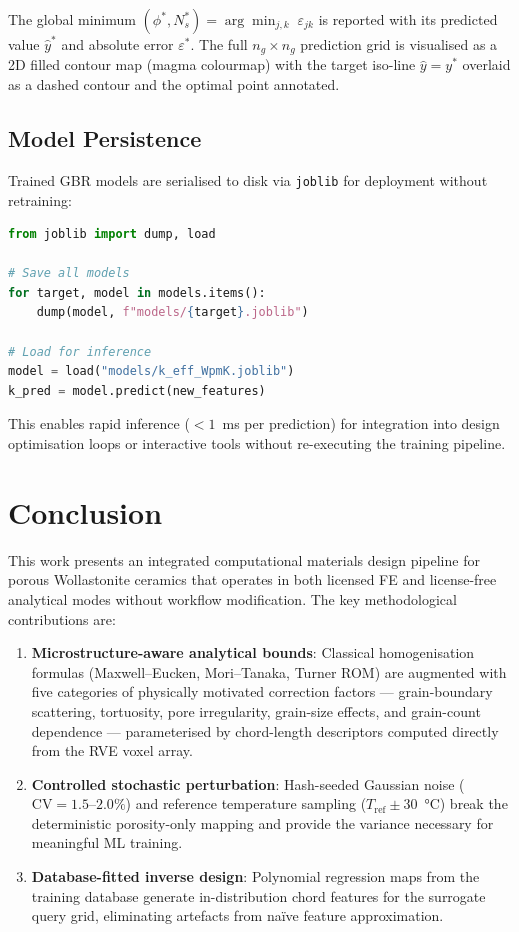 \documentclass[11pt,a4paper]{article}
\begin{document}
The global minimum $(\phi^*, N_s^*) = \arg\min_{j,k}\; \varepsilon_{jk}$ is reported with its predicted value $\hat{y}^*$ and absolute error $\varepsilon^*$. The full $n_g \times n_g$ prediction grid is visualised as a 2D filled contour map (magma colourmap) with the target iso-line $\hat{y} = y^*$ overlaid as a dashed contour and the optimal point annotated.

\subsection{Model Persistence}

Trained GBR models are serialised to disk via \texttt{joblib} for deployment without retraining:
\begin{lstlisting}[language=Python, caption=Model serialisation and loading.]
from joblib import dump, load

# Save all models
for target, model in models.items():
    dump(model, f"models/{target}.joblib")

# Load for inference
model = load("models/k_eff_WpmK.joblib")
k_pred = model.predict(new_features)
\end{lstlisting}

This enables rapid inference ($< 1$~ms per prediction) for integration into design optimisation loops or interactive tools without re-executing the training pipeline.

\section{Conclusion}
\label{sec:conclusion}

This work presents an integrated computational materials design pipeline for porous Wollastonite ceramics that operates in both licensed FE and license-free analytical modes without workflow modification. The key methodological contributions are:

\begin{enumerate}
    \item \textbf{Microstructure-aware analytical bounds}: Classical homogenisation formulas (Maxwell--Eucken, Mori--Tanaka, Turner ROM) are augmented with five categories of physically motivated correction factors --- grain-boundary scattering, tortuosity, pore irregularity, grain-size effects, and grain-count dependence --- parameterised by chord-length descriptors computed directly from the RVE voxel array.

    \item \textbf{Controlled stochastic perturbation}: Hash-seeded Gaussian noise ($\text{CV} = 1.5$--$2.0\%$) and reference temperature sampling ($T_{\text{ref}} \pm 30$~\si{\celsius}) break the deterministic porosity-only mapping and provide the variance necessary for meaningful ML training.

    \item \textbf{Database-fitted inverse design}: Polynomial regression maps from the training database generate in-distribution chord features for the surrogate query grid, eliminating artefacts from na\"ive feature approximation.
\end{enumerate}
\end{document}
